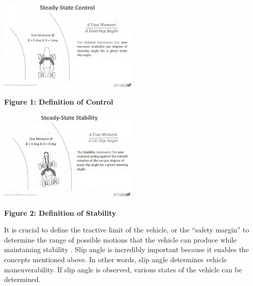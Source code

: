\documentclass[12pt]{article}
\begin{document}
        \begin{center}
            \vspace{0.5cm}

            \includegraphics[width=0.5\textwidth]{resources/Defining-of-control-Claude-Rouelle-Applied-VD-seminar.png}

            \vspace{0.5cm}

            \textbf{Figure 1: Definition of Control} \autocite{MMM}
            \label{control}
        
        \end{center}

        \begin{center}
            \vspace{0.5cm}

            \includegraphics[width=0.5\textwidth]{resources/Defining-of-stability-Claude-Rouelle-Applied-VD-seminar.png}

            \vspace{0.5cm}

            \textbf{Figure 2: Definition of Stability} \autocite{MMM}
            \label{stability}
        
        \end{center}

        It is crucial to define the tractive limit of the vehicle, or the “safety margin” to determine the range of 
        possible motions that the vehicle can produce while maintaining stability \autocite{MMM}. Slip angle is incredibly important 
        because it enables the concepts mentioned above. In other words, slip angle determines vehicle maneuverability. If 
        slip angle is observed, various states of the vehicle can be determined. 
\end{document}
